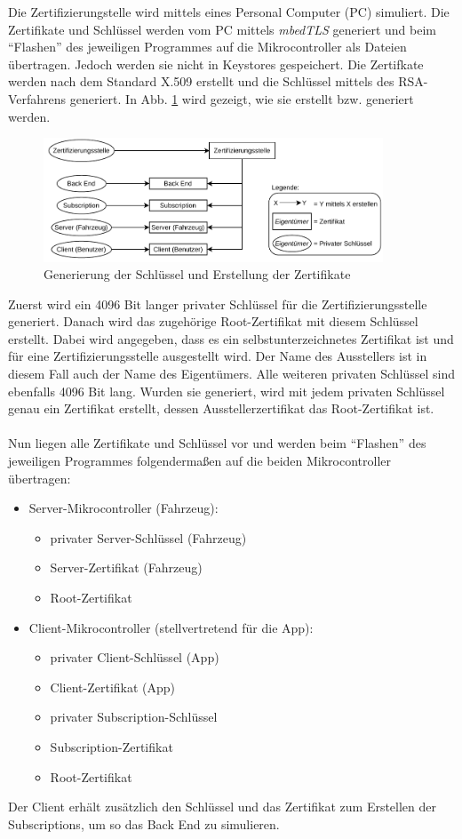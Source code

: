 Die Zertifizierungstelle wird mittels eines Personal Computer (PC) simuliert. Die Zertifikate und Schlüssel werden vom PC mittels \textit{mbedTLS} generiert und beim "`Flashen"' des jeweiligen Programmes auf die Mikrocontroller als Dateien übertragen. Jedoch werden sie nicht in Keystores gespeichert. Die Zertifkate werden nach dem Standard X.509 erstellt und die Schlüssel mittels des RSA-Verfahrens generiert. In Abb. \ref{fig: impl certs keys} wird gezeigt, wie sie erstellt bzw. generiert werden.
\begin{figure}[H]
    \centering
    \includegraphics[width=0.9\textwidth]{graphics/impl_keys_certs.pdf}
    \caption[Generierung der Schlüssel und Erstellung der Zertifikate]{Generierung der Schlüssel und Erstellung der Zertifikate}
    \label{fig: impl certs keys}
\end{figure}
Zuerst wird ein 4096 Bit langer privater Schlüssel für die Zertifizierungsstelle generiert. Danach wird das zugehörige Root-Zertifikat mit diesem Schlüssel erstellt. Dabei wird angegeben, dass es ein selbstunterzeichnetes Zertifikat ist und für eine Zertifizierungsstelle ausgestellt wird. Der Name des Ausstellers ist in diesem Fall auch der Name des Eigentümers. Alle weiteren privaten Schlüssel sind ebenfalls 4096 Bit lang. Wurden sie generiert, wird mit jedem privaten Schlüssel genau ein Zertifikat erstellt, dessen Ausstellerzertifikat das Root-Zertifikat ist.
\\\\
Nun liegen alle Zertifikate und Schlüssel vor und werden beim "`Flashen"' des jeweiligen Programmes folgendermaßen auf die beiden Mikrocontroller übertragen:
\begin{itemize}
    \item Server-Mikrocontroller (Fahrzeug):
    \begin{itemize}
        \item privater Server-Schlüssel (Fahrzeug)
        \item Server-Zertifikat (Fahrzeug)
        \item Root-Zertifikat
    \end{itemize}
    \item Client-Mikrocontroller (stellvertretend für die App):
    \begin{itemize}
        \item privater Client-Schlüssel (App)
        \item Client-Zertifikat (App)
        \item privater Subscription-Schlüssel
        \item Subscription-Zertifikat
        \item Root-Zertifikat
    \end{itemize}
\end{itemize}
Der Client erhält zusätzlich den Schlüssel und das Zertifikat zum Erstellen der Subscriptions, um so das Back End zu simulieren.